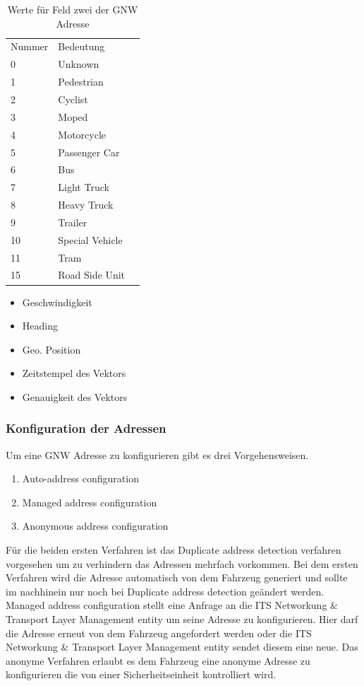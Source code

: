 \begin{table}[h]
\begin{tabular}{lll}
Nummer & Bedeutung  \\
    0 & Unknown \\
    1 & Pedestrian \\
    2 & Cyclist \\
    3 & Moped \\
    4 & Motorcycle \\
    5 & Passenger Car \\
    6 & Bus \\
    7 & Light Truck \\
    8 & Heavy Truck \\
    9 & Trailer \\
    10 & Special Vehicle \\
    11 & Tram \\
    15 & Road Side Unit \\
\end{tabular}
\caption{Werte für Feld zwei der \acs{GNW} Adresse\cite{etsi302636-4-1}}
\label{tab:typenspezi}
\end{table}


 \begin{itemize}
      	\item Geschwindigkeit
	\item Heading
	\item Geo. Position
	\item Zeitstempel des Vektors
	\item Genauigkeit des Vektors
\end{itemize}

\subsubsection{Konfiguration der Adressen}
Um eine \acl{GNW} Adresse zu konfigurieren gibt es drei Vorgehensweisen. 

\begin{enumerate}
      	\item Auto-address configuration
	\item Managed address configuration
	\item Anonymous address configuration
\end{enumerate}
Für die beiden ersten Verfahren ist das Duplicate address detection verfahren vorgesehen um zu verhindern das Adressen mehrfach vorkommen.
Bei dem ersten Verfahren wird die Adresse automatisch von dem Fahrzeug generiert und sollte im nachhinein nur noch bei Duplicate address detection geändert werden. 
Managed address configuration stellt eine Anfrage an die ITS Networkung \& Transport Layer Management entity um seine Adresse zu konfigurieren. Hier darf die Adresse erneut von dem Fahrzeug angefordert werden oder die ITS Networkung \& Transport Layer Management entity sendet diesem eine neue. Das anonyme Verfahren erlaubt es dem Fahrzeug eine anonyme Adresse zu konfigurieren die von einer Sicherheitseinheit kontrolliert wird.

